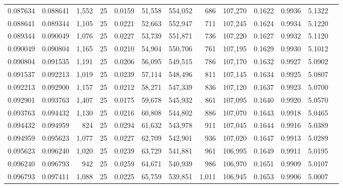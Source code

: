 \begin{tabular}{rrrrrrrrrrrrr}
0.087634 & 0.088641 & 1,552 &  25 &                                     0.0159 &  51,558 & 554,052 &     686 & 107,270 & 0.1622 & 0.9936 & 5.1322 \\
0.088641 & 0.089344 & 1,105 &  25 &                                     0.0221 &  52,663 & 552,947 &     711 & 107,245 & 0.1624 & 0.9934 & 5.1220 \\
0.089344 & 0.090049 & 1,076 &  25 &                                     0.0227 &  53,739 & 551,871 &     736 & 107,220 & 0.1627 & 0.9932 & 5.1120 \\
0.090049 & 0.090804 & 1,165 &  25 &                                     0.0210 &  54,904 & 550,706 &     761 & 107,195 & 0.1629 & 0.9930 & 5.1012 \\
0.090804 & 0.091535 & 1,191 &  25 &                                     0.0206 &  56,095 & 549,515 &     786 & 107,170 & 0.1632 & 0.9927 & 5.0902 \\
0.091537 & 0.092213 & 1,019 &  25 &                                     0.0239 &  57,114 & 548,496 &     811 & 107,145 & 0.1634 & 0.9925 & 5.0807 \\
0.092213 & 0.092900 & 1,157 &  25 &                                     0.0212 &  58,271 & 547,339 &     836 & 107,120 & 0.1637 & 0.9923 & 5.0700 \\
0.092901 & 0.093763 & 1,407 &  25 &                                     0.0175 &  59,678 & 545,932 &     861 & 107,095 & 0.1640 & 0.9920 & 5.0570 \\
0.093763 & 0.094432 & 1,130 &  25 &                                     0.0216 &  60,808 & 544,802 &     886 & 107,070 & 0.1643 & 0.9918 & 5.0465 \\
0.094432 & 0.094959 &   824 &  25 &                                     0.0294 &  61,632 & 543,978 &     911 & 107,045 & 0.1644 & 0.9916 & 5.0389 \\
0.094959 & 0.095623 & 1,077 &  25 &                                     0.0227 &  62,709 & 542,901 &     936 & 107,020 & 0.1647 & 0.9913 & 5.0289 \\
0.095623 & 0.096240 & 1,020 &  25 &                                     0.0239 &  63,729 & 541,881 &     961 & 106,995 & 0.1649 & 0.9911 & 5.0195 \\
0.096240 & 0.096793 &   942 &  25 &                                     0.0259 &  64,671 & 540,939 &     986 & 106,970 & 0.1651 & 0.9909 & 5.0107 \\
0.096793 & 0.097411 & 1,088 &  25 &                                     0.0225 &  65,759 & 539,851 &   1,011 & 106,945 & 0.1653 & 0.9906 & 5.0007 \\

\end{tabular}
